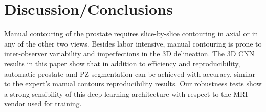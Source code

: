 \section{Discussion/Conclusions}
\label{sec:disc}
Manual contouring of the prostate requires slice-by-slice contouring in axial or in any of the other two views. Besides labor intensive, manual contouring is prone to inter-observer variability and imperfections in the 3D delineation. The 3D CNN results in this paper show that in addition to efficiency and reproducibility, automatic prostate and PZ segmentation can be achieved with accuracy, similar to the expert's manual contours reproducibility results. Our robustness tests show a strong sensibility of this deep learning architecture with respect to the MRI vendor used for training. 


